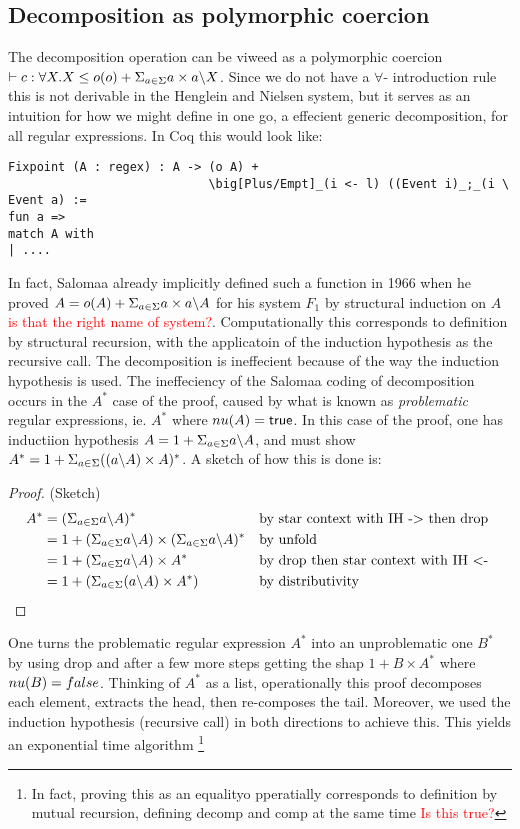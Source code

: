 \documentclass[a4paper,UKenglish,cleveref, autoref, thm-restate]{lipics-v2021}
\newcommand\mycomment[1]{\textcolor{red}{#1}}
\begin{document}
\subsection{Decomposition as polymorphic coercion}
The decomposition operation can be viweed as a polymorphic coercion $\contains{}{c}{\forall X. X}{\myo{o} + \decomp{X}}$. Since we do not have a $\forall$- introduction rule this is not derivable in the Henglein and Nielsen system, but it serves as an intuition for how we might define in one go, a effecient generic decomposition, for all regular expressions. In Coq this would look like:
\begin{verbatim}
Fixpoint (A : regex) : A -> (o A) +  
                            \big[Plus/Empt]_(i <- l) ((Event i)_;_(i \ Event a) :=
fun a => 
match A with 
| ....
\end{verbatim}
In fact, Salomaa already implicitly defined such a function in 1966 when he proved $A = o(A) + \Sigma_{a \in \Sigma} a\times a \backslash A$ for his system $F_1$ by structural induction on $A$ \mycomment{is that the right name of system?}. Computationally this corresponds to definition by structural recursion, with the applicatoin of the induction hypothesis as the recursive call. The decomposition is ineffecient because of the way the  induction hypothesis is used. The ineffeciency of the Salomaa coding of decomposition occurs in the $A^*$ case of the proof, caused by what is known as \textit{problematic} regular expressions, ie. $A^ *$ where $\mynu{A} = \textsf{true}$. In this case of the proof, one has inductiion hypothesis $A = 1 + \Sigma_{a \in \Sigma} a \backslash A$, and must show $A^* = 1  + \Sigma_{a \in \Sigma} ((a \backslash A)\times A)^*$. A sketch of how this is done is:
\begin{proof} (Sketch)
\begin{align}
A^* &= ( \Sigma_{a \in \Sigma} a \backslash A)^* &&\text{by star context with IH -> then drop}\\
 &= 1 + (\Sigma_{a \in \Sigma} a \backslash A) \times (\Sigma_{a \in \Sigma} a \backslash A)^* &&\text{by unfold}\\
 &= 1 + (\Sigma_{a \in \Sigma} a \backslash A) \times A^* && \text{by drop then star context with IH <- } \\
 &= 1 + (\Sigma_{a \in \Sigma} (a \backslash A) \times A^*) && \text{by distributivity }
\end{align}
\end{proof}
One turns the problematic regular expression $A^*$ into an unproblematic one $B^*$ by using drop and after a few more steps getting the shap $1 + B \times A^*$ where $\mynu{B} = \false$. Thinking of $A^*$ as a list, operationally this proof decomposes each element, extracts the head, then re-composes the tail. Moreover, we used the induction hypothesis (recursive call) in both directions to achieve this. This yields an exponential time algorithm \footnote{In fact, proving this as an equalityo pperatially corresponds to definition by mutual recursion, defining \textsf{decomp} and \textsf{comp} at the same time \mycomment{Is this true?}}
\end{document}
